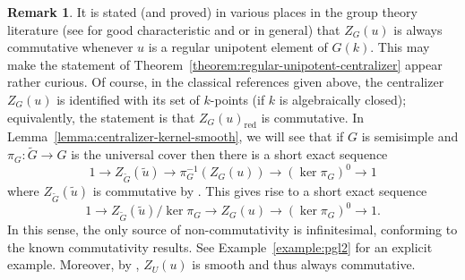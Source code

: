 \documentclass[11pt,reqno]{amsart}
\theoremstyle{definition}
\newtheorem{remark}[theorem]{Remark}
\renewcommand{\rm}{\mathrm}
\begin{document}
\begin{remark}\label{remark:not-always-commutative}
It is stated (and proved) in various places in the group theory literature (see \cite{Springer-note} for good characteristic and \cite{Lou} or \cite[III, Corollary 1.16]{Springer-Steinberg} in general) that $Z_G(u)$ is always commutative whenever $u$ is a regular unipotent element of $G(k)$. This may make the statement of Theorem~\ref{theorem:regular-unipotent-centralizer} appear rather curious. Of course, in the classical references given above, the centralizer $Z_G(u)$ is identified with its set of $k$-points (if $k$ is algebraically closed); equivalently, the statement is that $Z_G(u)_{\rm{red}}$ is commutative. In Lemma~\ref{lemma:centralizer-kernel-smooth}, we will see that if $G$ is semisimple and $\pi_G: \widetilde{G} \to G$ is the universal cover then there is a short exact sequence
\[
1 \to Z_{\widetilde{G}}(\widetilde{u}) \to \pi_G^{-1}(Z_G(u)) \to (\ker \pi_G)^0 \to 1
\]
where $Z_{\widetilde{G}}(\widetilde{u})$ is commutative by \cite[Corollary 3.11]{Integral-Springer}. This gives rise to a short exact sequence
\[
1 \to Z_{\widetilde{G}}(\widetilde{u})/\ker \pi_G \to Z_G(u) \to (\ker \pi_G)^0 \to 1.
\]
In this sense, the only source of non-commutativity is infinitesimal, conforming to the known commutativity results. See Example~\ref{example:pgl2} for an explicit example. Moreover, by \cite[Lemma 3.4]{Integral-Springer}, $Z_U(u)$ is smooth and thus always commutative.
\end{remark}
\end{document}
